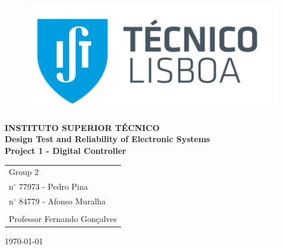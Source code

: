 \documentclass[12pt]{article}
\begin{document}
	
	
	
	\begin{titlepage}
		\begin{figure}
			\includegraphics[scale=0.4]{IST} 
		\end{figure}
		
		\vspace*{3cm}
		\begin{center}
			\headingfont\Large{\bfseries INSTITUTO SUPERIOR TÉCNICO}\\[2cm]
			\headingfont\LARGE{\bfseries Design Test and Reliability of Electronic Systems \\[1,5cm]Project 1 - Digital Controller}\\[0,5cm]
		\end{center}
		\vspace{3cm}
		\headingfont\hfill
		\begin{tabular}{@{}l@{}}
		    Group 2\\ 
			n$^{\circ}$ 77973 - Pedro Pina\\
			n$^{\circ}$ 84779 - Afonso Muralha\\
			\\
			Professor Fernando Gonçalves
			
		\end{tabular}
		\vspace{2,5cm}
		\begin{center}
			\today
		\end{center}
	\end{titlepage}
\end{document}
